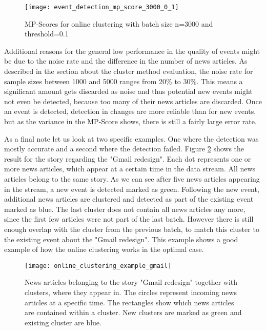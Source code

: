 \begin{figure}[h]
    \centering
    \texttt{[image: event\_detection\_mp\_score\_3000\_0\_1]}
    \caption{MP-Scores for online clustering with batch size n=3000 and threshold=0.1}
    \label{fig:event_detection_mp_score_3000_0_1}
\end{figure}


Additional reasons for the general low performance in the quality of events might be due to the noise rate and the difference in the number of news articles. As described in the section about the cluster method evaluation, the noise rate for sample sizes between 1000 and 5000 ranges from 20\% to 30\%. This means a significant amount gets discarded as noise and thus potential new events might not even be detected, because too many of their news articles are discarded. Once an event is detected, detection in changes are more reliable than for new events, but as the variance in the MP-Score shows, there is still a fairly large error rate.


As a final note let us look at two specific examples. One where the detection was mostly accurate and a second where the detection failed. Figure \ref{fig:online_clustering_example_gmail} shows the result for the story regarding the "Gmail redesign". Each dot represents one or more news articles, which appear at a certain time in the data stream. All news articles belong to the same story. As we can see after five news articles appearing in the stream, a new event is detected marked as green. Following the new event, additional news articles are clustered and detected as part of the existing event marked as blue. The last cluster does not contain all news articles any more, since the first few articles were not part of the last batch. However there is still enough overlap with the cluster from the previous batch, to match this cluster to the existing event about the "Gmail redesign". This example shows a good example of how the online clustering works in the optimal case.

\begin{figure}[h]
    \centering
    \texttt{[image: online\_clustering\_example\_gmail]}
    \caption{News articles belonging to the story "Gmail redesign" together with clusters, where they appear in. The circles represent incoming news articles at a specific time. The rectangles show which news articles are contained within a cluster. New clusters are marked as green and existing cluster are blue.}
    \label{fig:online_clustering_example_gmail}
\end{figure}

